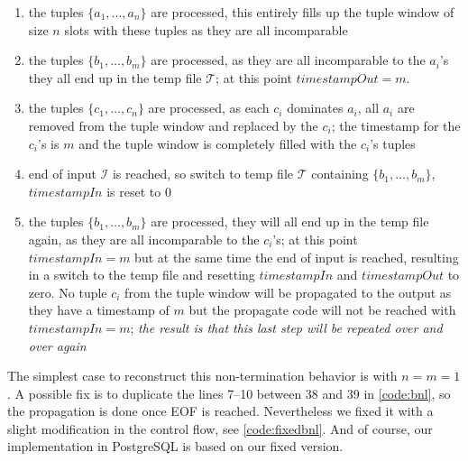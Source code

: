 \begin{enumerate}
\item 
the tuples $\{a_1, \ldots, a_n\}$ are processed, this entirely fills up
the tuple window of size $n$ slots with these tuples as they are all
incomparable

\item 
the tuples $\{b_1, \ldots, b_m\}$ are processed, as they are all
incomparable to the $a_i$'s they all end up in the temp file
$\mathcal{T}$; at this point $timestampOut = m$.

\item
the tuples $\{c_1, \ldots, c_n\}$ are processed, as each $c_i$
dominates $a_i$, all $a_i$ are removed from the tuple window and
replaced by the $c_i$; the timestamp for the $c_i$'s is $m$ and the
tuple window is completely filled with the $c_i$'s tuples

\item
end of input $\mathcal{I}$ is reached, so switch to temp file
$\mathcal{T}$ containing $\{b_1, \ldots, b_m\}$, $timestampIn$ is
reset to $0$

\item
the tuples $\{b_1, \ldots, b_m\}$ are processed, they will all end up
in the temp file again, as they are all incomparable to the $c_i$'s;
at this point $timestampIn = m$ but at the same time the end of input
is reached, resulting in a switch to the temp file and resetting
$timestampIn$ and $timestampOut$ to zero. No tuple $c_i$ from the
tuple window will be propagated to the output as they have a timestamp
of $m$ but the propagate code will not be reached with $timestampIn =
m$;
\emph{the result is that this last step will be repeated over and over again}
\end{enumerate}

The simplest case to reconstruct this non-termination behavior is with
$n=m=1$.  A possible fix is to duplicate the lines 7--10 between 38
and 39 in \autoref{code:bnl}, so the propagation is done once EOF
is reached.  Nevertheless we fixed it with a slight modification in
the control flow, see \autoref{code:fixedbnl}.  And of course, our
implementation in PostgreSQL is based on our fixed version.


